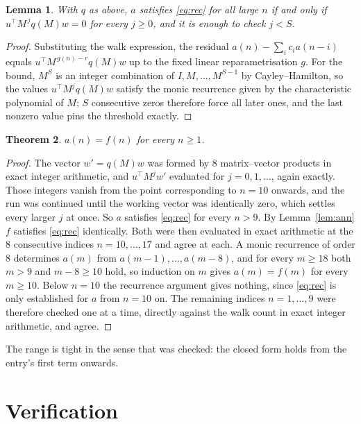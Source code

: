 \documentclass[11pt,a4paper]{article}
\theoremstyle{plain}
\newtheorem{theorem}{Theorem}
\newtheorem{lemma}[theorem]{Lemma}
\theoremstyle{definition}
\begin{document}
\begin{lemma}\label{lem:crit}
With $q$ as above, $a$ satisfies \eqref{eq:rec} for all large $n$ if and only if
$u^{\!\top}M^{\,j}q(M)w=0$ for every $j\ge0$, and it is enough to check $j<S$.
\end{lemma}

\begin{proof}
Substituting the walk expression, the residual $a(n)-\sum_ic_ia(n-i)$ equals
$u^{\!\top}M^{\,g(n)-r}q(M)w$ up to the fixed linear reparametrisation $g$. For the bound,
$M^{S}$ is an integer combination of $I,M,\dots,M^{S-1}$ by Cayley--Hamilton, so the values
$u^{\!\top}M^{j}q(M)w$ satisfy the monic recurrence given by the characteristic polynomial of
$M$; $S$ consecutive zeros therefore force all later ones, and the last nonzero value pins the
threshold exactly.
\end{proof}

\begin{theorem}
$a(n)=f(n)$ for every $n\ge1$.
\end{theorem}

\begin{proof}
The vector $w'=q(M)w$ was formed by $8$ matrix--vector products in exact integer
arithmetic, and $u^{\!\top}M^{j}w'$ evaluated for $j=0,1,\dots$, again exactly. Those integers
vanish from the point corresponding to $n=10$ onwards, and the run was continued until the
working vector was identically zero, which settles every larger $j$ at once. So $a$ satisfies
\eqref{eq:rec} for every $n>9$. By Lemma~\ref{lem:ann} $f$ satisfies \eqref{eq:rec}
identically. Both were then evaluated in exact arithmetic at the $8$ consecutive indices
$n=10,\dots,17$ and agree at each. A monic recurrence of order $8$
determines $a(m)$ from $a(m-1),\dots,a(m-8)$, and for every $m\ge18$ both
$m>9$ and $m-8\ge10$ hold, so induction on $m$ gives $a(m)=f(m)$ for every
$m\ge10$.
Below $n=10$ the recurrence argument gives nothing, since \eqref{eq:rec} is only
established for $a$ from $n=10$ on. The remaining indices $n=1,\dots,9$ were
therefore checked one at a time, directly against the walk count in exact integer arithmetic,
and agree.
\end{proof}

The range is tight in the sense that was checked: the closed form holds from the entry's first term onwards.

\section{Verification}
\end{document}
